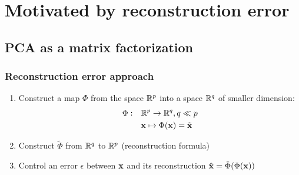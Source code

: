 \documentclass{beamer}\usepackage[]{graphicx}\usepackage[]{color}
\begin{document}
\section{Motivated by reconstruction error}

\subsection{PCA as a matrix factorization}

\begin{frame}
  \frametitle{Reconstruction error approach}

  \begin{enumerate}
    \item  Construct a map $\Phi$ from the space $\mathbb{R}^{p}$ into a space $\mathbb{R}^{q}$ of \alert{smaller dimension}:
      \begin{align*}
      \Phi:\quad & \mathbb{R}^{p} \to \mathbb{R}^{q}, q \ll p\\
               & \mathbf{x} \mapsto \Phi(\mathbf{x}) = \tilde{\mathbf{x}}
      \end{align*}
    \item Construct $\tilde{\Phi}$ from $\mathbb{R}^{q}$ to $\mathbb{R}^{p}$ (\alert{reconstruction formula})
     \item Control an error $\epsilon$ between $\mathbf{x}$ and its reconstruction $\hat {\mathbf{x}} = \tilde{\Phi}(\Phi(\mathbf{x}))$
  \end{enumerate}

\bigskip

\end{frame}
\end{document}
